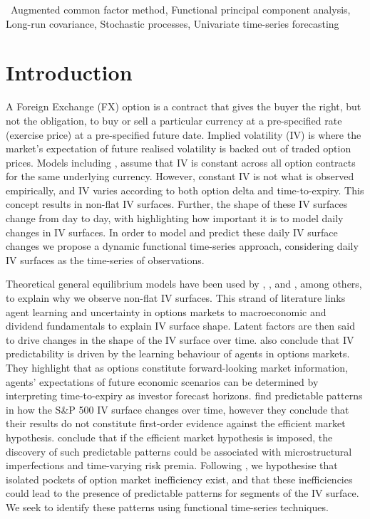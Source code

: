 \documentclass[12pt,a4paper]{article}
\begin{document}
 \  Augmented common factor method, Functional principal component analysis, Long-run covariance, Stochastic processes, Univariate time-series forecasting


\newpage
{}

\section{Introduction}
A Foreign Exchange (FX) option is a contract that gives the buyer the right, but not the obligation, to buy or sell a particular currency at a pre-specified rate (exercise price) at a pre-specified future date. Implied volatility (IV) is where the market's expectation of future realised volatility is backed out of traded option prices. Models including \cite{BS73}, assume that IV is constant across all option contracts for the same underlying currency. However, constant IV is not what is observed empirically, and IV varies according to both option delta and time-to-expiry. This concept results in non-flat IV surfaces. Further, the shape of these IV surfaces change from day to day, with \cite{DGS08, KST08} highlighting how important it is to model daily changes in IV surfaces. In order to model and predict these daily IV surface changes we propose a dynamic functional time-series approach, considering daily IV surfaces as the time-series of observations.

Theoretical general equilibrium models have been used by \cite{DV00}, \cite{GT03}, \cite{GLR03} and \cite{BG15}, among others, to explain why we observe non-flat IV surfaces. This strand of literature links agent learning and uncertainty in options markets to macroeconomic and dividend fundamentals to explain IV surface shape. Latent factors are then said to drive changes in the shape of the IV surface over time. \cite{BG14, BG15} also conclude that IV predictability is driven by the learning behaviour of agents in options markets. They highlight that as options constitute forward-looking market information, agents' expectations of future economic scenarios can be determined by interpreting time-to-expiry as investor forecast horizons. \cite{GG06} find predictable patterns in how the S\&P 500 IV surface changes over time, however they conclude that their results do not constitute first-order evidence against the efficient market hypothesis. \cite{BG14} conclude that if the efficient market hypothesis is imposed, the discovery of such predictable patterns could be associated with microstructural imperfections and time-varying risk premia. Following \cite{BG14}, we hypothesise that isolated pockets of option market inefficiency exist, and that these inefficiencies could lead to the presence of predictable patterns for segments of the IV surface. We seek to identify these patterns using functional time-series techniques.
\end{document}
